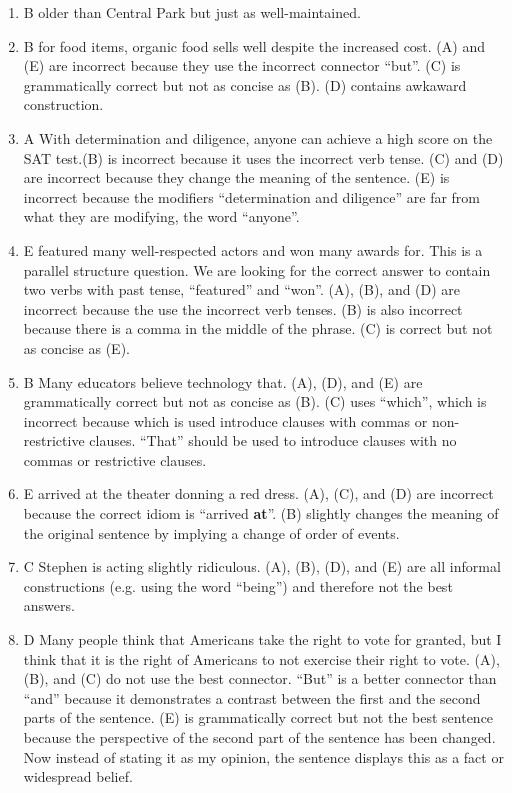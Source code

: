 \begin{enumerate}
\item B older than Central Park but just as well-maintained. 
\item B for food items, organic food sells well despite the increased cost. (A) and (E) are incorrect because they use the incorrect connector ``but''. (C) is grammatically correct but not as concise as (B). (D) contains awkaward construction. 
\item A With determination and diligence, anyone can achieve a high score on the SAT test.(B) is incorrect because it uses the incorrect verb tense. (C) and (D) are incorrect because they change the meaning of the sentence. (E) is incorrect because the modifiers ``determination and diligence'' are far from what they are modifying, the word ``anyone''. 
\item E featured many well-respected actors and won many awards for. This is a parallel structure question. We are looking for the correct answer to contain two verbs with past tense, ``featured'' and ``won''. (A), (B), and (D) are incorrect because the use the incorrect verb tenses. (B) is also incorrect because there is a comma in the middle of the phrase. (C) is correct but not as concise as (E). 
\item B Many educators believe technology that. (A), (D), and (E) are grammatically correct but not as concise as (B). (C) uses ``which'', which is incorrect because which is used introduce clauses with commas or non-restrictive clauses. ``That'' should be used to introduce clauses with no commas or restrictive clauses.
\item E arrived at the theater donning a red dress. (A), (C), and (D) are incorrect because the correct idiom is ``arrived \textbf{at}''. (B) slightly changes the meaning of the original sentence by implying a change of order of events. 
\item C Stephen is acting slightly ridiculous. (A), (B), (D), and (E) are all informal constructions (e.g. using the word ``being'') and therefore not the best answers.
\item D Many people think that Americans take the right to vote for granted, but I think that it is the right of Americans to not exercise their right to vote. (A),  (B), and (C) do not use the best connector. ``But'' is a better connector than ``and'' because it demonstrates a contrast between the first and the second parts of the sentence. (E) is grammatically correct but not the best sentence because the perspective of the second part of the sentence has been changed. Now instead of stating it as my opinion, the sentence displays this as a fact or widespread belief. 

\end{enumerate}
